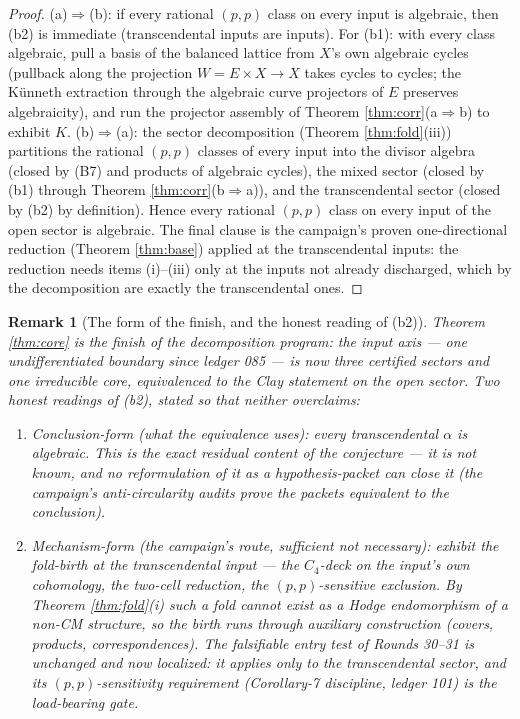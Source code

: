 \documentclass[11pt]{article}
\newtheorem{remark}[theorem]{Remark}
\begin{document}
\begin{proof}
(a)$\Rightarrow$(b): if every rational $(p,p)$ class on every input is
algebraic, then (b2) is immediate (transcendental inputs are inputs). For
(b1): with every class algebraic, pull a basis of the balanced lattice from
$X$'s own algebraic cycles (pullback along the projection $W=E\times X\to X$
takes cycles to cycles; the Künneth extraction through the algebraic curve
projectors of $E$ preserves algebraicity), and run the projector assembly of
Theorem \ref{thm:corr}(a$\Rightarrow$b) to exhibit $K$.
(b)$\Rightarrow$(a): the sector decomposition (Theorem \ref{thm:fold}(iii))
partitions the rational $(p,p)$ classes of every input into the divisor
algebra (closed by (B7) and products of algebraic cycles), the mixed sector
(closed by (b1) through Theorem \ref{thm:corr}(b$\Rightarrow$a)), and the
transcendental sector (closed by (b2) by definition). Hence every rational
$(p,p)$ class on every input of the open sector is algebraic. The final
clause is the campaign's proven one-directional reduction (Theorem
\ref{thm:base}) applied at the transcendental inputs: the reduction needs
items (i)--(iii) only at the inputs not already discharged, which by the
decomposition are exactly the transcendental ones.
\end{proof}

\begin{remark}[The form of the finish, and the honest reading of (b2)]
Theorem \ref{thm:core} is the finish of the decomposition program: the input
axis --- one undifferentiated boundary since ledger 085 --- is now three
certified sectors and one irreducible core, equivalenced to the Clay
statement on the open sector. Two honest readings of (b2), stated so that
neither overclaims:
\begin{enumerate}[label=(\roman*)]
\item \emph{Conclusion-form} (what the equivalence uses): every
transcendental $\alpha$ is algebraic. This is the exact residual content of
the conjecture --- it is not known, and no reformulation of it as a
hypothesis-packet can close it (the campaign's anti-circularity audits prove
the packets equivalent to the conclusion).
\item \emph{Mechanism-form} (the campaign's route, sufficient not necessary):
exhibit the fold-birth at the transcendental input --- the $C_4$-deck on the
input's own cohomology, the two-cell reduction, the $(p,p)$-sensitive
exclusion. By Theorem \ref{thm:fold}(i) such a fold cannot exist as a Hodge
endomorphism of a non-CM structure, so the birth runs through auxiliary
construction (covers, products, correspondences). The falsifiable entry test
of Rounds 30--31 is unchanged and now \emph{localized}: it applies only to
the transcendental sector, and its $(p,p)$-sensitivity requirement
(Corollary-7 discipline, ledger 101) is the load-bearing gate.
\end{enumerate}
\end{remark}
\end{document}
